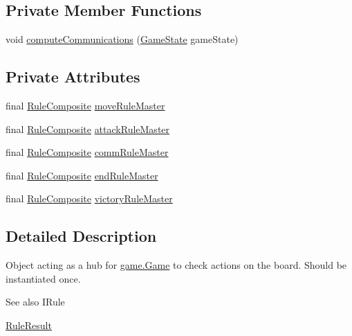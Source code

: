 \subsection*{Private Member Functions}
\begin{DoxyCompactItemize}
\item 
void \mbox{\hyperlink{classrule_engine_1_1_rule_checker_a271924d22d328a894f36885c6d7f3833}{compute\+Communications}} (\mbox{\hyperlink{classgame_1_1game_state_1_1_game_state}{Game\+State}} game\+State)
\end{DoxyCompactItemize}
\subsection*{Private Attributes}
\begin{DoxyCompactItemize}
\item 
final \mbox{\hyperlink{classrule_engine_1_1rules_1_1new_rules_1_1_rule_composite}{Rule\+Composite}} \mbox{\hyperlink{classrule_engine_1_1_rule_checker_aec159dfb32f2f9bbe81f94337c5d5aea}{move\+Rule\+Master}}
\item 
final \mbox{\hyperlink{classrule_engine_1_1rules_1_1new_rules_1_1_rule_composite}{Rule\+Composite}} \mbox{\hyperlink{classrule_engine_1_1_rule_checker_ac6422d6a1adb7c31883648d38467bbee}{attack\+Rule\+Master}}
\item 
final \mbox{\hyperlink{classrule_engine_1_1rules_1_1new_rules_1_1_rule_composite}{Rule\+Composite}} \mbox{\hyperlink{classrule_engine_1_1_rule_checker_a7ef777f526414716ec201b9c75b07908}{comm\+Rule\+Master}}
\item 
final \mbox{\hyperlink{classrule_engine_1_1rules_1_1new_rules_1_1_rule_composite}{Rule\+Composite}} \mbox{\hyperlink{classrule_engine_1_1_rule_checker_a22c69affa781268b6476666725131ecf}{end\+Rule\+Master}}
\item 
final \mbox{\hyperlink{classrule_engine_1_1rules_1_1new_rules_1_1_rule_composite}{Rule\+Composite}} \mbox{\hyperlink{classrule_engine_1_1_rule_checker_a14ae1ce557eac389bba1db7a1e698507}{victory\+Rule\+Master}}
\end{DoxyCompactItemize}


\subsection{Detailed Description}
Object acting as a hub for \mbox{\hyperlink{classgame_1_1_game}{game.\+Game}} to check actions on the board. Should be instantiated once.

\begin{DoxySeeAlso}{See also}
I\+Rule 

\mbox{\hyperlink{classrule_engine_1_1_rule_result}{Rule\+Result}} 
\end{DoxySeeAlso}


